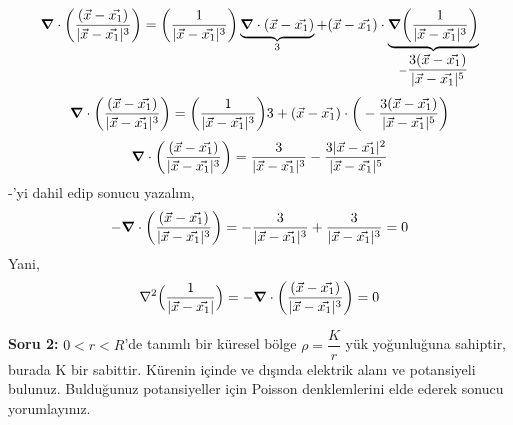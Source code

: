\begin{align}
\grad \cdot \bigg( \dfrac{(\Vec{x} - \Vec{x_{1}})}{|\Vec{x} - \Vec{x_{1}}|^{3}} \bigg) = \bigg( \dfrac{1}{|\Vec{x} - \Vec{x_{1}}|^{3}} \bigg) \underbrace{\grad \cdot (\Vec{x} - \Vec{x_{1}})}_{3} + (\Vec{x} - \Vec{x_{1}}) \cdot \underbrace{\grad \bigg( \dfrac{1}{|\Vec{x} - \Vec{x_{1}}|^{3}} \bigg)}_{- \dfrac{3 (\Vec{x} - \Vec{x_{1}})}{|\Vec{x} - \Vec{x_{1}}|^{5}}}
\end{align}
\begin{align}
\grad \cdot \bigg( \dfrac{(\Vec{x} - \Vec{x_{1}})}{|\Vec{x} - \Vec{x_{1}}|^{3}} \bigg) = \bigg( \dfrac{1}{|\Vec{x} - \Vec{x_{1}}|^{3}} \bigg) 3 + (\Vec{x} - \Vec{x_{1}}) \cdot \bigg( - \dfrac{3 (\Vec{x} - \Vec{x_{1}})}{|\Vec{x} - \Vec{x_{1}}|^{5}} \bigg)
\end{align}
\begin{align}
\grad \cdot \bigg( \dfrac{(\Vec{x} - \Vec{x_{1}})}{|\Vec{x} - \Vec{x_{1}}|^{3}} \bigg) =  \dfrac{3}{|\Vec{x} - \Vec{x_{1}}|^{3}}   - \dfrac{3 |\Vec{x} - \Vec{x_{1}}|^{2}}{|\Vec{x} - \Vec{x_{1}}|^{5}} 
\end{align}
-'yi dahil edip sonucu yazalım,
\begin{align}
- \grad \cdot \bigg( \dfrac{(\Vec{x} - \Vec{x_{1}})}{|\Vec{x} - \Vec{x_{1}}|^{3}} \bigg) =  - \dfrac{3}{|\Vec{x} - \Vec{x_{1}}|^{3}}  + \dfrac{3}{|\Vec{x} - \Vec{x_{1}}|^{3}} = 0
\end{align}
Yani,
\begin{align}
\nabla^{2} \Big( \dfrac{1}{|\Vec{x} - \Vec{x_{1}}|} \Big) =  - \grad \cdot \bigg( \dfrac{(\Vec{x} - \Vec{x_{1}})}{|\Vec{x} - \Vec{x_{1}}|^{3}} \bigg) = 0
\end{align}



\newpage


\begin{flushleft}
	\textbf{Soru 2:} $ 0 < r < R$'de tanımlı bir küresel bölge $\rho = \dfrac{K}{r}$ yük yoğunluğuna sahiptir, burada K bir sabittir. Kürenin içinde ve dışında elektrik alanı ve potansiyeli bulunuz. Bulduğunuz potansiyeller için Poisson denklemlerini elde ederek sonucu yorumlayınız.
\end{flushleft}
   
